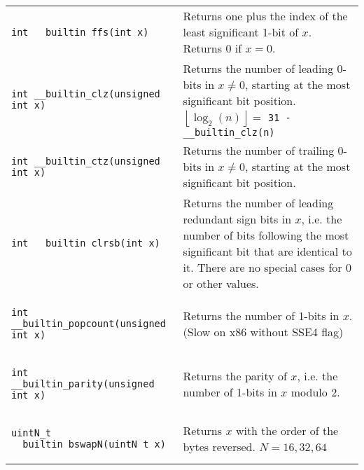 \documentclass[letterpaper]{article}
\begin{document}
\begin{tabular}{lp{12cm}}
    \begin{lstlisting}
int __builtin_ffs(int x)
\end{lstlisting}               & Returns one plus the index of the least significant 1-bit of $x$. Returns 0 if $x=0$.                                                                                                          \\
    \begin{lstlisting}
int __builtin_clz(unsigned int x)
\end{lstlisting}      & Returns the number of leading 0-bits in $x\neq0$, starting at the most significant bit position. $\left\lfloor\log_2\left(n\right)\right\rfloor=$ \texttt{31 - \_\_builtin\_clz(n)}                     \\
    \begin{lstlisting}
int __builtin_ctz(unsigned int x)
\end{lstlisting}      & Returns the number of trailing 0-bits in $x\neq0$, starting at the most significant bit position.                                                                                                       \\
    \begin{lstlisting}
int __builtin_clrsb(int x)
\end{lstlisting}             & Returns the number of leading redundant sign bits in $x$, i.e. the number of bits following the most significant bit that are identical to it. There are no special cases for 0 or other values. \\
    \begin{lstlisting}
int __builtin_popcount(unsigned int x)
\end{lstlisting} & Returns the number of 1-bits in $x$. (Slow on x86 without SSE4 flag)                                                                                                                                         \\
    \begin{lstlisting}
int __builtin_parity(unsigned int x)
\end{lstlisting}   & Returns the parity of $x$, i.e. the number of 1-bits in $x$ modulo 2.                                                                                                                                      \\
    \begin{lstlisting}
uintN_t __builtin_bswapN(uintN_t x)
\end{lstlisting}    & Returns $x$ with the order of the bytes reversed. $N=16,32,64$                                                                                                                                            \\

\end{tabular}
\end{document}
